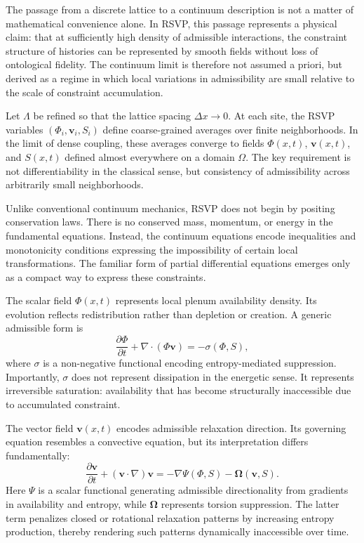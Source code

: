 \documentclass[11pt,oneside]{book}
\begin{document}
The passage from a discrete lattice to a continuum description is not a matter of mathematical convenience alone. In RSVP, this passage represents a physical claim: that at sufficiently high density of admissible interactions, the constraint structure of histories can be represented by smooth fields without loss of ontological fidelity. The continuum limit is therefore not assumed a priori, but derived as a regime in which local variations in admissibility are small relative to the scale of constraint accumulation.

Let \(\Lambda\) be refined so that the lattice spacing \(\Delta x \to 0\). At each site, the RSVP variables \((\Phi_i, \mathbf{v}_i, S_i)\) define coarse-grained averages over finite neighborhoods. In the limit of dense coupling, these averages converge to fields \(\Phi(x,t)\), \(\mathbf{v}(x,t)\), and \(S(x,t)\) defined almost everywhere on a domain \(\Omega\). The key requirement is not differentiability in the classical sense, but consistency of admissibility across arbitrarily small neighborhoods.

Unlike conventional continuum mechanics, RSVP does not begin by positing conservation laws. There is no conserved mass, momentum, or energy in the fundamental equations. Instead, the continuum equations encode inequalities and monotonicity conditions expressing the impossibility of certain local transformations. The familiar form of partial differential equations emerges only as a compact way to express these constraints.

The scalar field \(\Phi(x,t)\) represents local plenum availability density. Its evolution reflects redistribution rather than depletion or creation. A generic admissible form is
\[
\frac{\partial \Phi}{\partial t} + \nabla \cdot (\Phi \mathbf{v}) = -\sigma(\Phi,S),
\]
where \(\sigma\) is a non-negative functional encoding entropy-mediated suppression. Importantly, \(\sigma\) does not represent dissipation in the energetic sense. It represents irreversible saturation: availability that has become structurally inaccessible due to accumulated constraint.

The vector field \(\mathbf{v}(x,t)\) encodes admissible relaxation direction. Its governing equation resembles a convective equation, but its interpretation differs fundamentally:
\[
\frac{\partial \mathbf{v}}{\partial t} + (\mathbf{v}\cdot\nabla)\mathbf{v}
= -\nabla \Psi(\Phi,S) - \mathbf{\Omega}(\mathbf{v},S).
\]
Here \(\Psi\) is a scalar functional generating admissible directionality from gradients in availability and entropy, while \(\mathbf{\Omega}\) represents torsion suppression. The latter term penalizes closed or rotational relaxation patterns by increasing entropy production, thereby rendering such patterns dynamically inaccessible over time.
\end{document}
